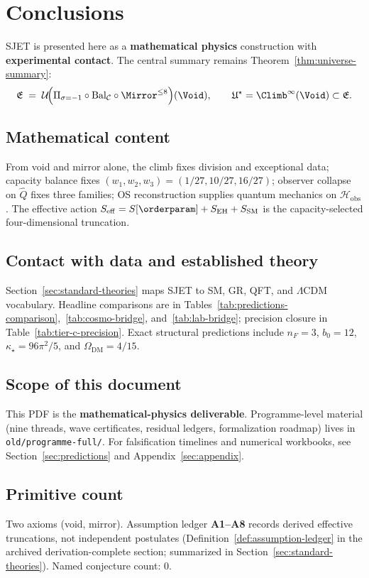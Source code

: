 \section{Conclusions}
\label{sec:conclusions}

SJET is presented here as a \textbf{mathematical physics} construction with
\textbf{experimental contact}. The central summary remains
Theorem~\ref{thm:universe-summary}:
\begin{equation}
  \mathfrak{E}
  \;=\;
  \mathcal{U}\!\Bigl(
    \Pi_{\sigma=-1}\circ\mathrm{Bal}_{\mathcal{C}}\circ\Mirror^{\leq 8}
  \Bigr)(\Void),
  \qquad
  \mathfrak{U}^\star=\Climb^\infty(\Void)\subset\mathfrak{E}.
\end{equation}

\subsection{Mathematical content}

From void and mirror alone, the climb fixes division and exceptional data;
capacity balance fixes $(w_1,w_2,w_3)=(1/27,10/27,16/27)$; observer collapse
on $\hat Q$ fixes three families; OS reconstruction supplies quantum mechanics
on $\mathcal{H}_{\mathrm{obs}}$. The effective action
$S_{\mathrm{eff}}=S[\orderparam]+S_{\mathrm{EH}}+S_{\mathrm{SM}}$ is the
capacity-selected four-dimensional truncation.

\subsection{Contact with data and established theory}

Section~\ref{sec:standard-theories} maps SJET to SM, GR, QFT, and $\Lambda$CDM
vocabulary. Headline comparisons are in
Tables~\ref{tab:predictions-comparison},~\ref{tab:cosmo-bridge},
and~\ref{tab:lab-bridge}; precision closure in
Table~\ref{tab:tier-c-precision}. Exact structural predictions include
$n_F=3$, $b_0=12$, $\kappa_\star=96\pi^2/5$, and $\Omega_{\mathrm{DM}}=4/15$.

\subsection{Scope of this document}

This PDF is the \textbf{mathematical-physics deliverable}. Programme-level
material (nine threads, wave certificates, residual ledgers, formalization
roadmap) lives in \texttt{old/programme-full/}. For falsification timelines
and numerical workbooks, see Section~\ref{sec:predictions} and
Appendix~\ref{sec:appendix}.

\subsection{Primitive count}

Two axioms (void, mirror). Assumption ledger \textbf{A1--A8} records derived
effective truncations, not independent postulates
(Definition~\ref{def:assumption-ledger} in the archived derivation-complete
section; summarized in Section~\ref{sec:standard-theories}). Named
conjecture count: $0$.